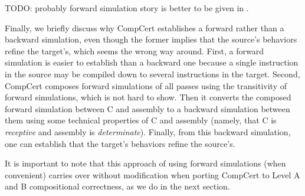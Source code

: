 TODO: probably forward simulation story is better to be given in .

Finally, we briefly discuss why CompCert establishes a forward
rather than a backward simulation, even though the former implies that
the source's behaviors refine the target's, which seems the wrong way
around.  First, a forward simulation is easier to establish than a
backward one because a single instruction in the source may be
compiled down to several instructions in the target. Second, CompCert
composes forward simulations of all passes using the transitivity of
forward simulations, which is not hard to show. Then it converts the
composed forward simulation between C and assembly to a backward
simulation between them using some technical properties of C and
assembly (namely, that C is \emph{receptive} and assembly is
\emph{determinate}). Finally, from this backward simulation, one can
establish that the target's behaviors refine the source's.

It is important to note that this approach of using forward
simulations (when convenient) carries over without modification when
porting CompCert to Level A and B compositional correctness, as we do
in the next section.



